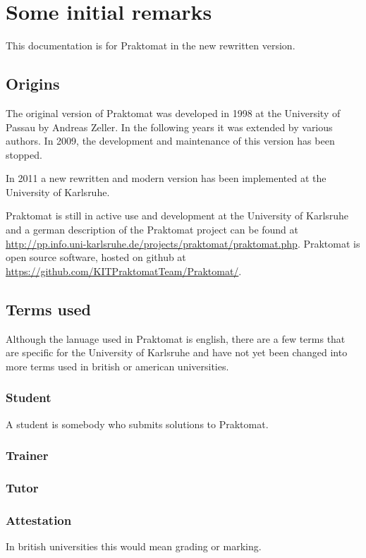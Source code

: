 
\section{Some initial remarks}

This documentation is for Praktomat in the new rewritten version.

\subsection{Origins}

The original version of Praktomat was developed in 1998 at the University of Passau by Andreas Zeller. In the following years it was extended by various authors. In 2009, the development and maintenance of this version has been stopped.

In 2011 a new rewritten and modern version has been implemented at the University of Karlsruhe.

Praktomat is still in active use and development at the University of Karlsruhe and a german description of the Praktomat project can be found at \url{http://pp.info.uni-karlsruhe.de/projects/praktomat/praktomat.php}. Praktomat is open source software, hosted on github at \url{https://github.com/KITPraktomatTeam/Praktomat/}.

\subsection{Terms used}

Although the lanuage used in Praktomat is english, there are a few terms that are specific for the University of Karlsruhe and have not yet been changed into more terms used in british or american universities.

\subsubsection{Student}

A student is somebody who submits solutions to Praktomat.

\subsubsection{Trainer}

\subsubsection{Tutor}

\subsubsection{Attestation}

In british universities this would mean grading or marking.